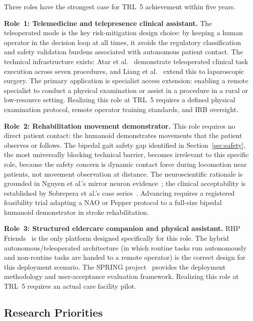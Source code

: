 Three roles have the strongest case for TRL~5 achievement within five years.

\textbf{Role~1: Telemedicine and telepresence clinical assistant.} The teleoperated
mode is the key risk-mitigation design choice: by keeping a human operator in the
decision loop at all times, it avoids the regulatory classification and safety
validation burdens associated with autonomous patient contact. The technical
infrastructure exists: Atar et al.~\cite{atar2025humanoids} demonstrate
teleoperated clinical task execution across seven procedures, and Liang et
al.~\cite{liang2025lapsurgie} extend this to laparoscopic surgery. The primary
application is specialist access extension: enabling a remote specialist to
conduct a physical examination or assist in a procedure in a rural or low-resource
setting. Realizing this role at TRL~5 requires a defined physical examination
protocol, remote operator training standards, and IRB oversight.

\textbf{Role~2: Rehabilitation movement demonstrator.} This role requires no
direct patient contact: the humanoid demonstrates movements that the patient
observes or follows. The bipedal gait safety gap identified in
Section~\ref{sec:safety}, the most universally blocking technical
barrier, becomes irrelevant to this specific role, because the safety concern is
dynamic contact force during locomotion near patients, not movement observation at
distance. The neuroscientific rationale is grounded in Nguyen et al.'s mirror
neuron evidence~\cite{nguyen2024eeg}; the clinical acceptability is established by
Sobrepera et al.'s case series~\cite{sobrepera2022feasibility}. Advancing requires a registered
feasibility trial adapting a NAO or Pepper protocol to a full-size bipedal
humanoid demonstrator in stroke rehabilitation.

\textbf{Role~3: Structured eldercare companion and physical assistant.} RHP
Friends~\cite{benallegue2025rhp} is the only platform designed specifically for
this role. The hybrid autonomous/teleoperated architecture (in which routine
tasks run autonomously and non-routine tasks are handed to a remote
operator) is the correct design for this deployment scenario. The SPRING
project~\cite{alamedapineda2024spring} provides the deployment methodology and
user-acceptance evaluation framework. Realizing this role at TRL~5 requires an
actual care facility pilot.

\subsection{Research Priorities}
\label{sec:research}

